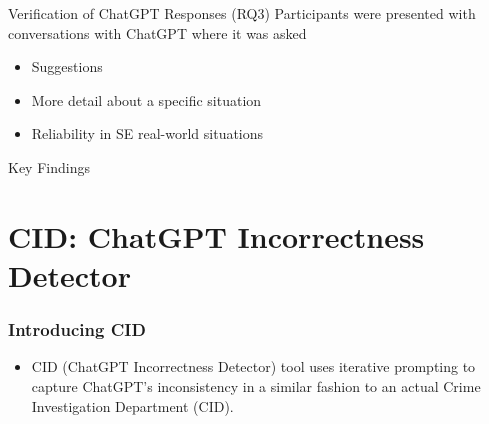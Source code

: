 \begin{frame}{Verification of ChatGPT Responses (RQ3)}
    Participants were presented with conversations with ChatGPT where it was asked
    \begin{itemize}
        \item Suggestions 
        \item More detail about a specific situation
        \item Reliability in SE real-world situations
    \end{itemize}
\end{frame}

\begin{frame}{Key Findings}
    \begin{center}
    \end{center}
\end{frame}



\section{CID: ChatGPT Incorrectness Detector}


\begin{frame}
    \frametitle{Introducing CID}
    \begin{itemize}
        \item CID (ChatGPT Incorrectness Detector) tool
uses iterative prompting to capture ChatGPT’s inconsistency in a
similar fashion to an actual Crime Investigation Department (CID).
    \end{itemize}
\end{frame}

